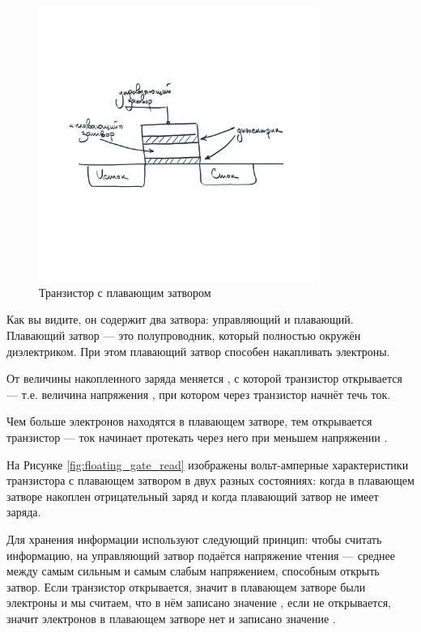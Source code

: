 \begin{figure}[H]
\centering
% 
\includegraphics[width=0.8\textwidth]{./images/lab_6/floating_gate_transistor}
\caption{Транзистор с плавающим затвором}
\label{fig:floating_gate_transistor}
\end{figure}

\par{Как вы видите, он содержит два затвора: управляющий и плавающий. Плавающий затвор --- это полупроводник, который полностью окружён диэлектриком. При этом плавающий затвор способен накапливать электроны.}
\par{От величины накопленного заряда меняется , с которой транзистор открывается --- т.е. величина напряжения , при котором через транзистор начнёт течь ток.}
\par{Чем больше электронов находятся в плавающем затворе, тем  открывается транзистор --- ток начинает протекать через него при меньшем напряжении .}

\par{На Рисунке \ref{fig:floating_gate_read} изображены вольт-амперные характеристики транзистора с плавающем затвором в двух разных состояниях: когда в плавающем затворе накоплен отрицательный заряд и когда плавающий затвор не имеет заряда.}
\par{Для хранения информации используют следующий принцип: чтобы считать информацию, на управляющий затвор подаётся напряжение чтения --- среднее между самым сильным и самым слабым напряжением, способным открыть затвор. Если транзистор открывается, значит в плавающем затворе были электроны и мы считаем, что в нём записано значение , если не открывается, значит электронов в плавающем затворе нет и записано значение .}

